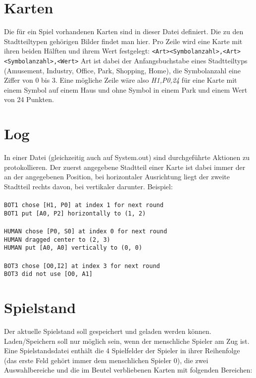 \section{Karten}
Die für ein Spiel vorhandenen Karten sind in dieser Datei definiert. Die zu den Stadtteiltypen gehörigen Bilder findet man hier.
Pro Zeile wird eine Karte mit ihren beiden Hälften und ihrem Wert festgelegt:
\verb|<Art><Symbolanzahl>,<Art><Symbolanzahl>,<Wert>|
Art ist dabei der Anfangsbuchstabe eines Stadtteiltyps (Amusement, Industry, Office, Park, Shopping, Home), die Symbolanzahl eine Ziffer von 0 bis 3. Eine mögliche Zeile wäre also \emph{H1,P0,24}
für eine Karte mit einem Symbol auf einem Haus und ohne Symbol in einem Park und einem Wert von 24 Punkten.

\section{Log}
In einer Datei (gleichzeitig auch auf System.out) sind durchgeführte Aktionen zu protokollieren. Der zuerst angegebene Stadtteil einer Karte ist dabei immer der an der angegebenen Position, bei horizontaler Ausrichtung liegt der zweite Stadtteil rechts davon, bei vertikaler darunter. Beispiel:\\
\\ \verb|BOT1 chose [H1, P0] at index 1 for next round|
\\ \verb|BOT1 put [A0, P2] horizontally to (1, 2)|\\
\\ \verb|HUMAN chose [P0, S0] at index 0 for next round|
\\ \verb|HUMAN dragged center to (2, 3)|
\\ \verb|HUMAN put [A0, A0] vertically to (0, 0)|\\
\\ \verb|BOT3 chose [O0,I2] at index 3 for next round|
\\ \verb|BOT3 did not use [O0, A1]|

\section{Spielstand}
Der aktuelle Spielstand soll gespeichert und geladen werden können. Laden/Speichern soll nur möglich sein, wenn der menschliche Spieler am Zug ist. Eine Spielstandsdatei enthält die 4 Spielfelder der Spieler in ihrer Reihenfolge (das erste Feld gehört immer dem menschlichen Spieler 0), die zwei Auswahlbereiche und die im Beutel verbliebenen Karten mit folgenden Bereichen:\\

